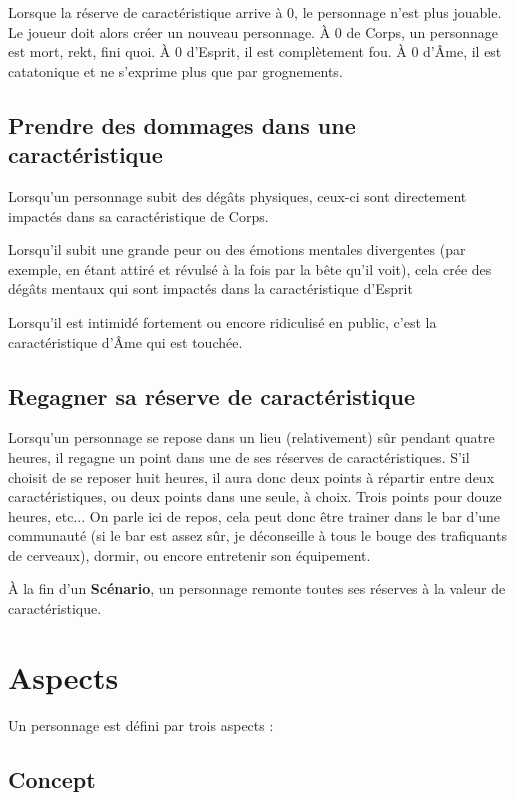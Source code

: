 \documentclass[a4paper,10pt,twoside,twocolumn,openany,bg=print]{dndbook}
\begin{document}
Lorsque la réserve de caractéristique arrive à 0, le personnage n'est plus jouable. Le joueur doit alors créer un nouveau personnage. À 0 de Corps, un personnage est mort, rekt, fini quoi. À 0 d'Esprit, il est complètement fou. À 0 d'Âme, il est catatonique et ne s'exprime plus que par grognements.

\subsection*{Prendre des dommages dans une caractéristique}

Lorsqu'un personnage subit des dégâts physiques, ceux-ci sont directement impactés dans sa caractéristique de Corps.

Lorsqu'il subit une grande peur ou des émotions mentales divergentes (par exemple, en étant attiré et révulsé à la fois par la bête qu'il voit), cela crée des dégâts mentaux qui sont impactés dans la caractéristique d'Esprit

Lorsqu'il est intimidé fortement ou encore ridiculisé en public, c'est la caractéristique d'Âme qui est touchée.

\subsection*{Regagner sa réserve de caractéristique}

Lorsqu'un personnage se repose dans un lieu (relativement) sûr pendant quatre heures, il regagne un point dans une de ses réserves de caractéristiques. S'il choisit de se reposer huit heures, il aura donc deux points à répartir entre deux caractéristiques, ou deux points dans une seule, à choix. Trois points pour douze heures, etc... On parle ici de repos, cela peut donc être trainer dans le bar d'une communauté (si le bar est assez sûr, je déconseille à tous le bouge des trafiquants de cerveaux), dormir, ou encore entretenir son équipement.

À la fin d'un \textbf{Scénario}, un personnage remonte toutes ses réserves à la valeur de caractéristique.

\section{Aspects}

Un personnage est défini par trois aspects :

\subsection*{Concept}
\end{document}
